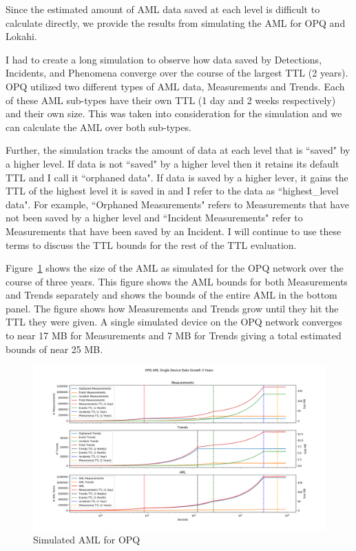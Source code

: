 Since the estimated amount of AML data saved at each level is difficult to calculate directly, we provide the results from simulating the AML for OPQ and Lokahi.

I had to create a long simulation to observe how data saved by Detections, Incidents, and Phenomena converge over the course of the largest TTL (2 years). OPQ utilized two different types of AML data, Measurements and Trends. Each of these AML sub-types have their own TTL (1 day and 2 weeks respectively) and their own size. This was taken into consideration for the simulation and we can calculate the AML over both sub-types.

Further, the simulation tracks the amount of data at each level that is ``saved" by a higher level. If data is not ``saved" by a higher level then it retains its default TTL and I call it ``orphaned data". If data is saved by a higher lever, it gains the TTL of the highest level it is saved in and I refer to the data as ``highest\_level data". For example, ``Orphaned Measurements" refers to Measurements that have not been saved by a higher level and ``Incident Measurements" refer to Measurements that have been saved by an Incident. I will continue to use these terms to discuss the TTL bounds for the rest of the TTL evaluation.

Figure~\ref{fig:sim_aml_opq} shows the size of the AML as simulated for the OPQ network over the course of three years. This figure shows the AML bounds for both Measurements and Trends separately and shows the bounds of the entire AML in the bottom panel. The figure shows how Measurements and Trends grow until they hit the TTL they were given. A single simulated device on the OPQ network converges to near 17 MB for Measurements and 7 MB for Trends giving a total estimated bounds of near 25 MB\@.

\begin{figure}[H]
	\centering
	\includegraphics[width=\linewidth]{figures/sim_aml_opq.png}
	\caption{Simulated AML for OPQ}
	\label{fig:sim_aml_opq}
\end{figure}

